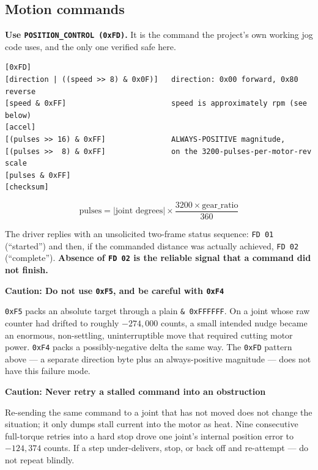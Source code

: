 \documentclass[11pt,letterpaper]{article}
\newenvironment{caution}[1]{%
    \par\addvspace{8pt}%
    \noindent{\color{cautionred}\rule{\linewidth}{0.8pt}}\par\vspace{2pt}
    \noindent\textbf{\color{cautionred}Caution: #1}\par\vspace{2pt}
}{%
    \par\vspace{2pt}\noindent{\color{cautionred}\rule{\linewidth}{0.4pt}}%
    \par\addvspace{8pt}%
}
\begin{document}
\subsection{Motion commands}
\label{sec:motion}

\textbf{Use \texttt{POSITION\_CONTROL (0xFD)}.} It is the command the project's own
working jog code uses, and the only one verified safe here.

\begin{lstlisting}[caption=0xFD frame layout]
[0xFD]
[direction | ((speed >> 8) & 0x0F)]   direction: 0x00 forward, 0x80 reverse
[speed & 0xFF]                        speed is approximately rpm (see below)
[accel]
[(pulses >> 16) & 0xFF]               ALWAYS-POSITIVE magnitude,
[(pulses >>  8) & 0xFF]               on the 3200-pulses-per-motor-rev scale
[pulses & 0xFF]
[checksum]
\end{lstlisting}

\[
\text{pulses} = |\text{joint degrees}| \times \frac{3200 \times \text{gear\_ratio}}{360}
\]

The driver replies with an unsolicited two-frame status sequence:
\texttt{FD 01} (``started'') and then, if the commanded distance was actually
achieved, \texttt{FD 02} (``complete''). \textbf{Absence of \texttt{FD 02} is the
reliable signal that a command did not finish.}

\begin{caution}{Do not use \texttt{0xF5}, and be careful with \texttt{0xF4}}
\texttt{0xF5} packs an absolute target through a plain \texttt{\& 0xFFFFFF}. On a
joint whose raw counter had drifted to roughly $-274{,}000$ counts, a small intended
nudge became an enormous, non-settling, uninterruptible move that required cutting
motor power. \texttt{0xF4} packs a possibly-negative delta the same way. The
\texttt{0xFD} pattern above --- a separate direction byte plus an always-positive
magnitude --- does not have this failure mode.
\end{caution}

\begin{caution}{Never retry a stalled command into an obstruction}
Re-sending the same command to a joint that has not moved does not change the
situation; it only dumps stall current into the motor as heat. Nine consecutive
full-torque retries into a hard stop drove one joint's internal position error to
$-124{,}374$ counts. If a step under-delivers, stop, or back off and re-attempt ---
do not repeat blindly.
\end{caution}
\end{document}
